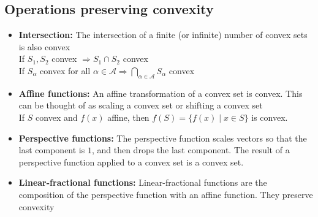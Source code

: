 \documentclass{article}
\begin{document}
\subsection{Operations preserving convexity}
\begin{itemize}
  \item \textbf{Intersection:} The intersection of a finite (or infinite) number of convex sets is also convex\\
  If $S_1, S_2$ convex $\Longrightarrow S_1 \cap S_2$ convex\\
  If $S_\alpha$ convex for all $\alpha \in \mathcal{A} \Longrightarrow \bigcap_{\alpha \in \mathcal{A}} S_\alpha$ convex
  \item \textbf{Affine functions:} An affine transformation of a convex set is convex. This can be thought of as scaling a convex set or shifting a convex set\\
  If $S$ convex and $f(x)$ affine, then $f(S) = \{f(x) \mid x \in S\}$ is convex. 
  \item \textbf{Perspective functions:} The perspective function scales vectors so that the last component is $1$, and then drops the last component. The result of a perspective function applied to a convex set is a convex set.
  \item \textbf{Linear-fractional functions:} Linear-fractional functions are the composition of the perspective function with an affine function. They preserve convexity
\end{itemize}
\end{document}
